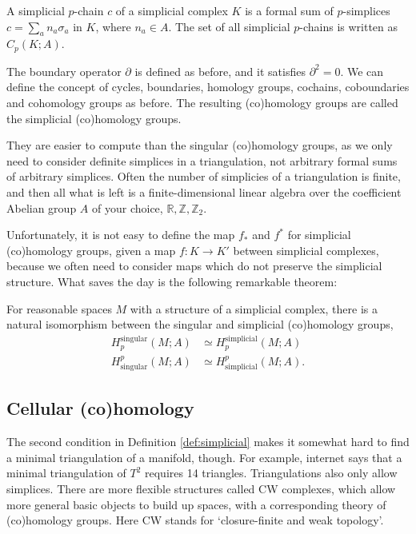 \documentclass[12pt]{article}
\numberwithin{equation}{section}
\theoremstyle{remark}
\def\bR{\mathbb{R}}
\def\bZ{\mathbb{Z}}
\begin{document}
\begin{definition}
  A simplicial $p$-chain $c$ of a simplicial complex $K$ is a formal sum of $p$-simplices $c=\sum_a n_a \sigma_a$ in $K$, where $n_a\in A$.
  The set of all simplicial $p$-chains is written as $C_p(K;A)$.
\end{definition}

The boundary operator $\partial$ is defined as before, and it satisfies $\partial^2=0$.
We can define the concept of cycles, boundaries, homology groups, cochains, coboundaries and cohomology groups as before.
The resulting (co)homology groups are called the simplicial (co)homology groups.

They are easier to compute than the singular (co)homology groups, 
as we only need to consider definite simplices in a triangulation,
not arbitrary formal sums of arbitrary simplices.
Often the number of simplicies of a triangulation is finite, and 
then all what is left is a finite-dimensional linear algebra over 
the coefficient Abelian group $A$ of your choice, $\bR, \bZ, \bZ_2$.

Unfortunately, it is not easy to define the map $f_*$ and $f^*$ 
for simplicial (co)homology groups, given a map $f:K\to K'$ 
between simplicial complexes,
because we often need to consider maps which do not preserve the simplicial structure.
What saves the day is the following remarkable theorem:
\begin{theorem}
For reasonable spaces $M$ with a structure of a simplicial complex,
there is a natural isomorphism between the singular and simplicial (co)homology groups, 
\begin{align}
  H_p^\text{singular}(M;A)&\simeq H_p^\text{simplicial}(M;A)\\
  H^p_\text{singular}(M;A)&\simeq H^p_\text{simplicial}(M;A).
\end{align}

\end{theorem}


\subsection{Cellular (co)homology}

The second condition in Definition \ref{def:simplicial} makes it somewhat hard to find a minimal triangulation of a manifold, though. 
For example, internet says that a minimal triangulation of $T^2$ requires 14 triangles.
Triangulations also only allow simplices. 
There are more flexible structures called CW complexes, which allow more general basic objects to build up spaces,
with a corresponding theory of (co)homology groups.
Here CW stands for `closure-finite and weak topology'.
\end{document}
